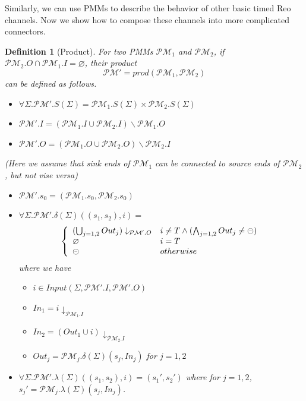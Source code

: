 \documentclass[conference, a4paper]{IEEEtran}
\newtheorem{definition}{Definition}
\newcommand{\rblock}[0]{\circleddash}
\newcommand{\rempty}[0]{\varnothing}
\begin{document}
Similarly, we can use PMMs to describe the behavior of other basic timed Reo
channels. Now we show how to compose these channels into more complicated connectors.

\begin{definition}[Product]
  For two PMMs $\mathcal{PM}_1$ and $\mathcal{PM}_2$, if
  $\mathcal{PM}_2.O\cap\mathcal{PM}_1.I=\varnothing$, their product 
  \[
  \mathcal{PM'} = prod(\mathcal{PM}_1,\mathcal{PM}_2)  \]
  can be defined as follows.
  \begin{itemize}
  	\item[-] $\forall\Sigma. \mathcal{PM}'.S(\Sigma)=\mathcal{PM}_1.S(\Sigma)\times \mathcal{PM}_2.S(\Sigma)$
    \item[-] $\mathcal{PM}'.I=(\mathcal{PM}_1.I\cup \mathcal{PM}_2.I)\backslash \mathcal{PM}_1.O$
    \item[-] $\mathcal{PM}'.O=(\mathcal{PM}_1.O\cup \mathcal{PM}_2.O)\backslash \mathcal{PM}_2.I$
  \end{itemize}
  \emph{(Here we assume that sink ends of $\mathcal{PM}_1$ can be connected to source ends of
  $\mathcal{PM}_2$, but not vise versa)}
  \begin{itemize}
    \item[-] $\mathcal{PM}'.s_0=(\mathcal{PM}_1.s_0, \mathcal{PM}_2.s_0)$
    \item[-] $\forall\Sigma. \mathcal{PM}'.\delta(\Sigma)((s_1,s_2), i)=$
      \begin{displaymath}
        \left\{
        \begin{array}[ht]{ll}
          (\bigcup_{j=1,2} Out_j)\downarrow_{\mathcal{PM}'.O} & i\neq T\land(\bigwedge_{j=1,2} Out_j\neq\rblock) \\
          \rempty & i = T \\
          \rblock & otherwise \\
        \end{array}
        \right.
      \end{displaymath}
      where we have
      \begin{itemize}
        \item[*] $i\in Input(\Sigma,\mathcal{PM}'.I,\mathcal{PM}'.O)$
        \item[*] $In_1 = i\downarrow_{\mathcal{PM}_1.I}$
        \item[*] $In_2 = (Out_1 \cup i)\downarrow_{\mathcal{PM}_2.I}$
        \item[*] $Out_j = \mathcal{PM}_j.\delta(\Sigma)(s_j,In_j)$ for $j=1,2$
      \end{itemize}
    \item[-] $\forall\Sigma. \mathcal{PM}'. \lambda(\Sigma)((s_1,s_2),i)=(s_1',s_2')$
      where for $j=1,2$, $s_j' = \mathcal{PM}_j.\lambda(\Sigma)(s_j,In_j)$.
  \end{itemize}
\end{definition}
\end{document}
